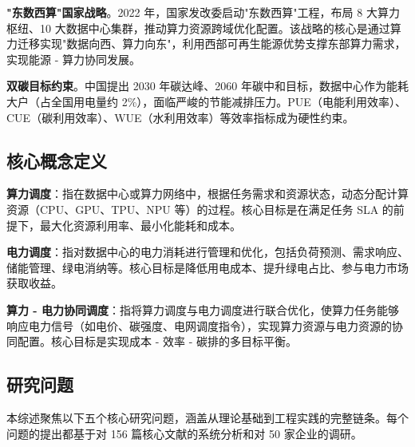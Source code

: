 \documentclass[12pt,a4paper]{article}
\begin{document}
\textbf{"东数西算"国家战略}。2022 年，国家发改委启动"东数西算"工程，布局 8 大算力枢纽、10 大数据中心集群，推动算力资源跨域优化配置\cite{dong2022east}。该战略的核心是通过算力迁移实现"数据向西、算力向东"，利用西部可再生能源优势支撑东部算力需求，实现能源 - 算力协同发展。

\textbf{双碳目标约束}。中国提出 2030 年碳达峰、2060 年碳中和目标，数据中心作为能耗大户（占全国用电量约 2\%），面临严峻的节能减排压力。PUE（电能利用效率）、CUE（碳利用效率）、WUE（水利用效率）等效率指标成为硬性约束\cite{jin2023carbon}。

\subsection{核心概念定义}

\textbf{算力调度}：指在数据中心或算力网络中，根据任务需求和资源状态，动态分配计算资源（CPU、GPU、TPU、NPU 等）的过程。核心目标是在满足任务 SLA 的前提下，最大化资源利用率、最小化能耗和成本。

\textbf{电力调度}：指对数据中心的电力消耗进行管理和优化，包括负荷预测、需求响应、储能管理、绿电消纳等。核心目标是降低用电成本、提升绿电占比、参与电力市场获取收益。

\textbf{算力 - 电力协同调度}：指将算力调度与电力调度进行联合优化，使算力任务能够响应电力信号（如电价、碳强度、电网调度指令），实现算力资源与电力资源的协同配置。核心目标是实现成本 - 效率 - 碳排的多目标平衡\cite{jin2023carbon,iea2023data}。

\subsection{研究问题}

本综述聚焦以下五个核心研究问题，涵盖从理论基础到工程实践的完整链条。每个问题的提出都基于对 156 篇核心文献的系统分析和对 50 家企业的调研。
\end{document}
